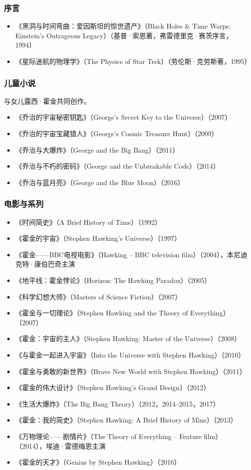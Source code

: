 \subsubsection{序言}
\begin{itemize}
\item 《黑洞与时间弯曲：爱因斯坦的惊世遗产》（Black Holes & Time Warps: Einstein's Outrageous Legacy）（基普·索恩著，弗雷德里克·赛茨序言，1994）  
\item 《星际迷航的物理学》（The Physics of Star Trek）（劳伦斯·克劳斯著，1995） 
\end{itemize} 
\subsubsection{儿童小说} 
与女儿露西·霍金共同创作。
\begin{itemize}
\item 《乔治的宇宙秘密钥匙》（George's Secret Key to the Universe）（2007）  
\item 《乔治的宇宙宝藏猎人》（George's Cosmic Treasure Hunt）（2009）  
\item 《乔治与大爆炸》（George and the Big Bang）（2011）  
\item 《乔治与不朽的密码》（George and the Unbreakable Code）（2014）  
\item 《乔治与蓝月亮》（George and the Blue Moon）（2016） 
\end{itemize} 
\subsubsection{电影与系列}  
\begin{itemize}
\item 《时间简史》（A Brief History of Time）（1992）  
\item 《霍金的宇宙》（Stephen Hawking's Universe）（1997）  
\item 《霍金——BBC电视电影》（Hawking – BBC television film）（2004），本尼迪克特·康伯巴奇主演  
\item 《地平线：霍金悖论》（Horizon: The Hawking Paradox）（2005）  
\item 《科学幻想大师》（Masters of Science Fiction）（2007）  
\item 《霍金与一切理论》（Stephen Hawking and the Theory of Everything）（2007）  
\item 《霍金：宇宙的主人》（Stephen Hawking: Master of the Universe）（2008）  
\item 《与霍金一起进入宇宙》（Into the Universe with Stephen Hawking）（2010）  
\item 《霍金与勇敢的新世界》（Brave New World with Stephen Hawking）（2011）  
\item 《霍金的伟大设计》（Stephen Hawking's Grand Design）（2012）  
\item 《生活大爆炸》（The Big Bang Theory）（2012，2014–2015，2017）  
\item 《霍金：我的简史》（Stephen Hawking: A Brief History of Mine）（2013）  
\item 《万物理论——剧情片》（The Theory of Everything – Feature film）（2014），埃迪·雷德梅恩主演  
\item 《霍金的天才》（Genius by Stephen Hawking）（2016）  
\end{itemize}
